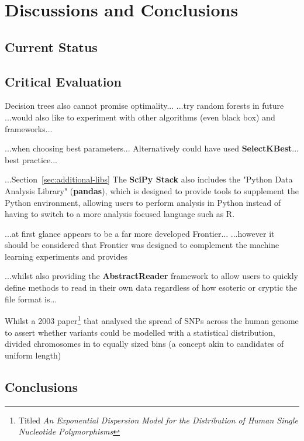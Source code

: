 \part{Discussions and Conclusions}
\chapter{Current Status}

\chapter{Critical Evaluation}
Decision trees also cannot promise optimality...
...try random forests in future
...would also like to experiment with other algorithms (even black box) and frameworks...

...when choosing best parameters...
Alternatively could have used \textbf{SelectKBest}...
best practice...\citep{sl:tips}

...Section~\ref{sec:additional-libs}
The \textbf{SciPy Stack} also includes the "Python Data Analysis Library"
(\textbf{pandas}), which is designed to provide tools to supplement the Python
environment, allowing users to perform analysis in Python instead of having to
switch to a more analysis focused language such as R.

...at first glance appears to be a far more developed Frontier...
...however it should be considered that Frontier was designed to complement the
machine learning experiments and provides 

...whilst also providing the \textbf{AbstractReader} framework to allow users to
quickly define methods to read in their own data regardless of how esoteric or
cryptic the file format is...


Whilst a 2003 paper\citep{kendal2003exponential}\footnote{Titled \textit{An Exponential
Dispersion Model for the Distribution of Human Single Nucleotide
Polymorphisms}\citep{kendal2003exponential}} that analysed the spread of SNPs
across the human genome to assert whether variants could be modelled with a
statistical distribution, divided chromosomes in to equally sized bins (a
concept akin to candidates of uniform length)

\chapter{Conclusions}

